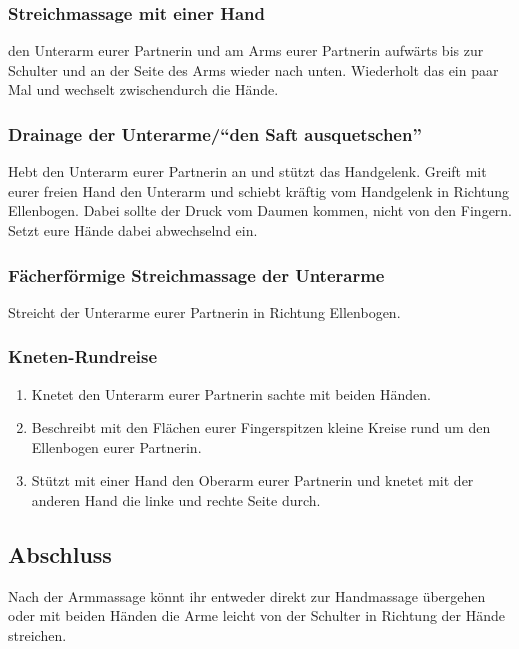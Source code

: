 \subsubsection{Streichmassage mit einer Hand}
 den Unterarm eurer Partnerin und  am Arms eurer Partnerin aufwärts bis zur Schulter und an der Seite des Arms wieder nach unten. Wiederholt das ein paar Mal und wechselt zwischendurch die Hände.

\subsubsection{Drainage der Unterarme/"`den Saft ausquetschen"'}
Hebt den Unterarm eurer Partnerin an und stützt das Handgelenk. Greift mit eurer freien Hand den Unterarm und schiebt kräftig vom Handgelenk in Richtung Ellenbogen. Dabei sollte der Druck vom Daumen kommen, nicht von den Fingern. Setzt eure Hände dabei abwechselnd ein.

\subsubsection{Fächerförmige Streichmassage der Unterarme}
Streicht  der Unterarme eurer Partnerin in Richtung Ellenbogen.

\subsubsection{Kneten-Rundreise}
\begin{oframed}
  \begin{enumerate}
    \item {} Knetet den Unterarm eurer Partnerin sachte mit beiden Händen.
    \item {} Beschreibt mit den Flächen eurer Fingerspitzen kleine Kreise rund um den Ellenbogen eurer Partnerin.
    \item {} Stützt mit einer Hand den Oberarm eurer Partnerin und knetet mit der anderen Hand die linke und rechte Seite durch.
  \end{enumerate}
\end{oframed}

\subsection{Abschluss}
Nach der Armmassage könnt ihr entweder direkt zur Handmassage übergehen oder mit beiden Händen die Arme leicht von der Schulter in Richtung der Hände streichen.

